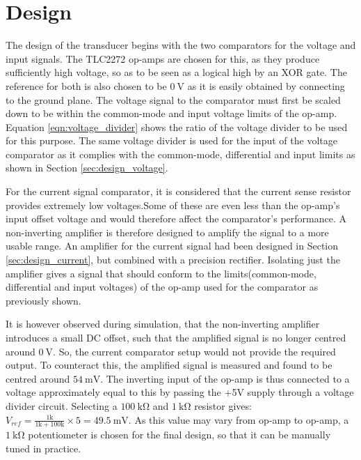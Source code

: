 \section{Design} \label{sec:design_phase}
The design of the transducer begins with the two comparators for the voltage and input signals. The TLC2272 op-amps are chosen for this, as they produce sufficiently high voltage, so as to be seen as a logical high by an XOR gate\cite{XOR}. The reference for both is also chosen to be $\SI{0}{\volt}$ as it is easily obtained by connecting to the ground plane. The voltage signal to the comparator must first be scaled down to be within the common-mode and input voltage limits of the op-amp. Equation \ref{eqn:voltage_divider} shows the ratio of the voltage divider to be used for this purpose. The same voltage divider is used for the input of the voltage comparator as it complies with the common-mode, differential and input limits as shown in Section \ref{sec:design_voltage}. 

For the current signal comparator, it is considered that the current sense resistor provides extremely low voltages.Some of these are even less than the op-amp's input offset voltage and would therefore affect the comparator's performance. A non-inverting amplifier is therefore designed to amplify the signal to a more usable range. An amplifier for the current signal had been designed in Section \ref{sec:design_current}, but combined with a precision rectifier. Isolating just the amplifier gives a signal that should conform  to the limits(common-mode, differential and input voltages) of the op-amp used for the comparator as previously shown. 

It is however observed during simulation, that the non-inverting amplifier introduces a small DC offset, such that the amplified signal is no longer centred around $\SI{0}{\volt}$. So, the current comparator setup would not provide the required output. To counteract this, the amplified signal is measured and found to be centred around $\SI{54}{\milli\volt}$. The inverting input of the op-amp is thus connected to a voltage approximately equal to this by passing the +5V supply through a voltage divider circuit. Selecting a $\SI{100}{\kilo\ohm}$ and $\SI{1}{\kilo\ohm}$ resistor gives: $V_{ref} = \frac{1\si{\kilo}}{1\si{\kilo}+100\si{\kilo}} \times 5 = \SI{49.5}{\milli\volt}$. As this value may vary from op-amp to op-amp, a $\SI{1}{\kilo\ohm}$ potentiometer is chosen for the final design, so that it can be manually tuned in practice.

